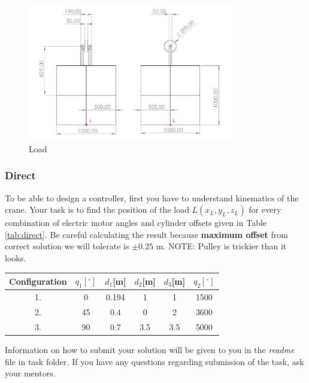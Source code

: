 \documentclass{article}
\begin{document}
	\begin{figure}[h!]
		\centering
		\includegraphics[width=0.8\textwidth]{teret.jpg}
		\caption{Load}
		\label{fig:load}
	\end{figure}
	
	\subsubsection{Direct}
	
	To be able to design a controller, first you have to understand  kinematics of the crane. Your task is to find the position of the load $L(x_L,y_L,z_L)$ for every combination of electric motor angles and cylinder offsets given in Table \ref{tab:direct}. Be careful calculating the result because \textbf{maximum offset} from correct solution we will tolerate is $\pm 0.25$ m.
	\noindent NOTE: Pulley is trickier than it looks.
	
	
	\begin{center}
		\label{tab:direct}
		\begin{tabular}{|| c || c c c c c ||}
			\hline
			Configuration & $q_1[^{\circ}]$ & $d_1$[m] & $d_2$[m] & $d_3$[m] &  
			$q_2[^{\circ}]$\\
			\hline\hline
			1. & 0 & 0.194 & 1 & 1 & 1500 \\ 
			\hline
			2. & 45 & 0.4 & 0 & 2 & 3600 \\
			\hline
			3. & 90 & 0.7 & 3.5  & 3.5 & 5000 \\
			\hline
		\end{tabular}
	\end{center}
	
	\noindent
	Information on how to submit your solution will be given to you in the \textit{readme} file in task folder. If you have any questions regarding submission of the task, ask your mentors.
	
\end{document}
